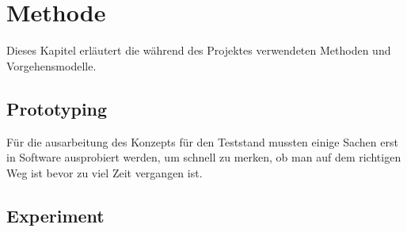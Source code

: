 \chapter{Methode}\label{ch:Methode}


Dieses Kapitel erläutert die während des Projektes verwendeten Methoden und Vorgehensmodelle.

\section{Prototyping}

Für die ausarbeitung des Konzepts für den Teststand mussten einige Sachen erst in Software ausprobiert werden, um schnell zu merken, ob man auf dem richtigen Weg ist bevor zu viel Zeit vergangen ist.


\section{Experiment}


